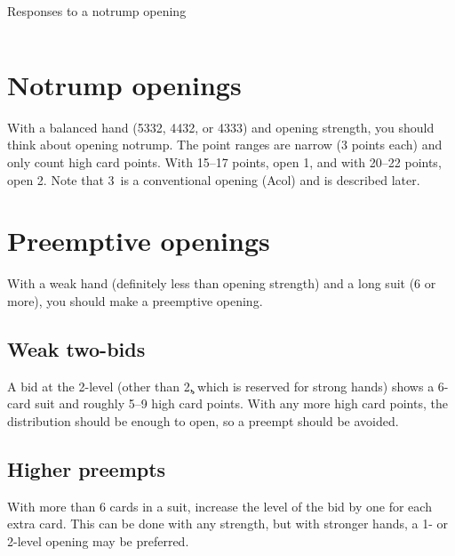 \begin{sheet}{Responses to a notrump opening}
\begin{columns}
\begin{column}[span=5]
\section{Notrump openings}
With a balanced hand (5332, 4432, or 4333) and opening strength, you should
think about opening notrump.  The point ranges are narrow (3 points each)
and only count high card points.  With 15--17 points, open 1\nt, and with
20--22 points, open 2\nt.  Note that 3\nt\ is a conventional opening (Acol)
and is described later.

\section{Preemptive openings}
With a weak hand (definitely less than opening strength) and a long suit
(6 or more), you should make a preemptive opening.
\subsection{Weak two-bids}
A bid at the 2-level (other than 2\c, which is reserved for strong hands)
shows a 6-card suit and roughly 5--9 high card points.  With any more high
card points, the distribution should be enough to open, so a preempt should
be avoided.
\subsection{Higher preempts}
With more than 6 cards in a suit, increase the level of the bid by one
for each extra card.  This can be done with any strength, but with stronger
hands, a 1- or 2-level opening may be preferred.
\end{column}
\end{columns}
\fi

\end{sheet}
